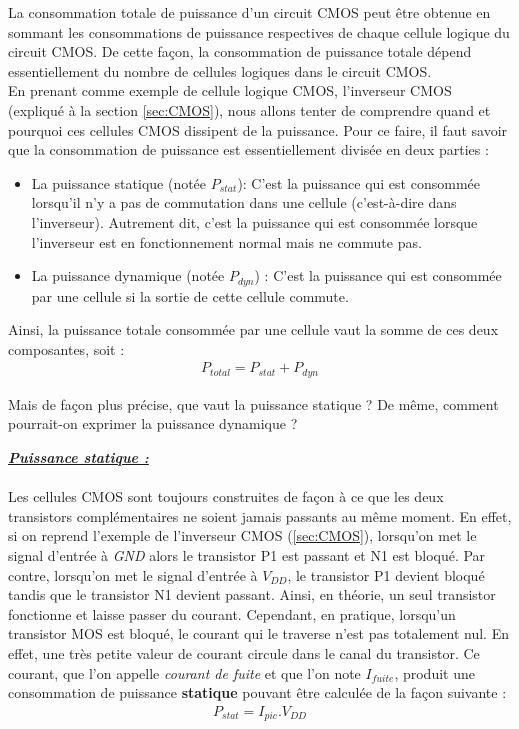\documentclass[10pt, oneside, a4paper]{article}
\begin{document}
La consommation totale de puissance d'un circuit CMOS peut être obtenue en sommant les consommations de puissance respectives de chaque cellule logique du circuit CMOS. De cette façon, la consommation de puissance totale dépend essentiellement du nombre de cellules logiques dans le circuit CMOS. \\
En prenant comme exemple de cellule logique CMOS, l'inverseur CMOS (expliqué à la section \ref{sec:CMOS}), nous allons tenter de comprendre quand et pourquoi ces cellules CMOS dissipent de la puissance. Pour ce faire, il faut savoir que la consommation de puissance est essentiellement divisée en deux parties : 
\begin{itemize}
\item La puissance statique (notée $P_{stat}$): C'est la puissance qui est consommée lorsqu'il n'y a pas de commutation dans une cellule (c'est-à-dire dans l'inverseur). Autrement dit, c'est la puissance qui est consommée lorsque l'inverseur est en fonctionnement normal mais ne commute pas.
\item La puissance dynamique (notée $P_{dyn}$) : C'est la puissance qui est consommée par une cellule si la sortie de cette cellule commute. 
\end{itemize}
Ainsi, la puissance totale consommée par une cellule vaut la somme de ces deux composantes, soit :
\begin{gather}
	P_{total} = P_{stat} + P_{dyn}
\end{gather}

Mais de façon plus précise, que vaut la puissance statique ? De même, comment pourrait-on exprimer la puissance dynamique ? 

\underline{\textbf{\textit{Puissance statique :}}} \\ \\
Les cellules CMOS sont toujours construites de façon à ce que les deux transistors complémentaires ne soient jamais passants au même moment. En effet, si on reprend l'exemple de l'inverseur CMOS (\ref{sec:CMOS}), lorsqu'on met le signal d'entrée à \textit{GND} alors le transistor P1 est passant et N1 est bloqué. Par contre, lorsqu'on met le signal d'entrée à \textit{$V_{DD}$}, le transistor P1 devient bloqué tandis que le transistor N1 devient passant. Ainsi, en théorie, un seul transistor fonctionne et laisse passer du courant. Cependant, en pratique, lorsqu'un transistor MOS est bloqué, le courant qui le traverse n'est pas totalement nul. En effet, une très petite valeur de courant circule dans le canal du transistor. Ce courant, que l'on appelle \textit{courant de fuite} et que l'on note \textit{$I_{fuite}$}, produit une consommation de puissance \textbf{statique} pouvant être calculée de la façon suivante :
\begin{gather}
	P_{stat} = I_{pic} . V_{DD}
\end{gather}
\end{document}
